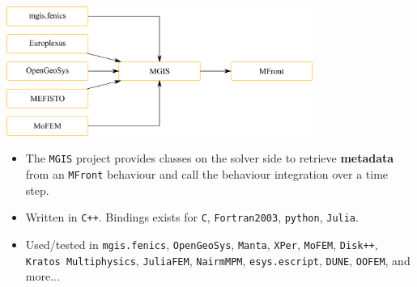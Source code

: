\documentclass{beamer}
\begin{document}
\begin{frame}
  \begin{center}
    \includegraphics[width=0.75\textwidth]{img/mgis.pdf}
  \end{center}
  \begin{itemize}
    \item The {\tt MGIS} project provides classes on the solver
    side to retrieve {\bf metadata} from an {\tt MFront} behaviour and
    call the behaviour integration over a time step.
    \item Written in \texttt{C++}. Bindings exists for
    \texttt{C}, \texttt{Fortran2003}, \texttt{python}, \texttt{Julia}.
    \item Used/tested in \texttt{mgis.fenics},
    \texttt{OpenGeoSys}, \texttt{Manta}, \texttt{XPer}, \texttt{MoFEM},
    \texttt{Disk++}, \texttt{Kratos Multiphysics}, \texttt{JuliaFEM},
    \texttt{NairmMPM}, \texttt{esys.escript}, \texttt{DUNE},
    \texttt{OOFEM}, and more...
  \end{itemize}
\end{frame}
\end{document}
